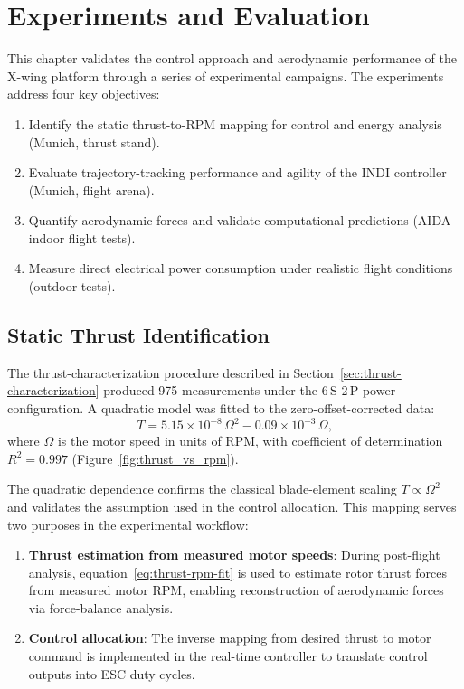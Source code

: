 
\chapter{Experiments and Evaluation}\label{chapter:experiments-evaluation}

This chapter validates the control approach and aerodynamic performance of the X-wing platform through a series of experimental campaigns.
The experiments address four key objectives:
\begin{enumerate}
\item Identify the static thrust-to-RPM mapping for control and energy analysis (Munich, thrust stand).
\item Evaluate trajectory-tracking performance and agility of the INDI controller (Munich, flight arena).
\item Quantify aerodynamic forces and validate computational predictions (AIDA indoor flight tests).
\item Measure direct electrical power consumption under realistic flight conditions (outdoor tests).
\end{enumerate}

\section{Static Thrust Identification}\label{sec:thrust-identification}

The thrust-characterization procedure described in Section~\ref{sec:thrust-characterization} produced 975 measurements under the 6\,S 2\,P power configuration.
A quadratic model was fitted to the zero-offset-corrected data:
\begin{equation}
T = 5.15 \times 10^{-8}\,\Omega^2 - 0.09 \times 10^{-3}\,\Omega,
\label{eq:thrust-rpm-fit}
\end{equation}
where $\Omega$ is the motor speed in units of RPM, with coefficient of determination $R^2 = 0.997$ (Figure~\ref{fig:thrust_vs_rpm}).

The quadratic dependence confirms the classical blade-element scaling $T \propto \Omega^2$ and validates the assumption used in the control allocation.
This mapping serves two purposes in the experimental workflow:
\begin{enumerate}
    \item \textbf{Thrust estimation from measured motor speeds}: During post-flight analysis, equation~\eqref{eq:thrust-rpm-fit} is used to estimate rotor thrust forces from measured motor RPM, enabling reconstruction of aerodynamic forces via force-balance analysis.
    \item \textbf{Control allocation}: The inverse mapping from desired thrust to motor command is implemented in the real-time controller to translate control outputs into ESC duty cycles.
\end{enumerate}

